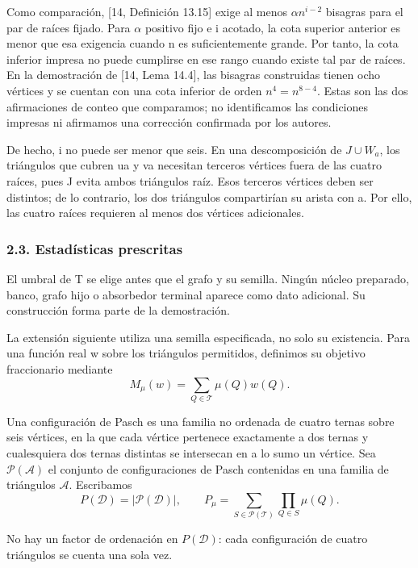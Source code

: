 \documentclass[spanish,11pt,a4paper]{article}
\begin{document}
Como comparación, {[}14, Definición 13.15{]} exige al menos \(\alpha n^{i-2}\) bisagras para el par de raíces fijado. Para \(\alpha\) positivo fijo e i acotado, la cota superior anterior es menor que esa exigencia cuando n es suficientemente grande. Por tanto, la cota inferior impresa no puede cumplirse en ese rango cuando existe tal par de raíces. En la demostración de {[}14, Lema 14.4{]}, las bisagras construidas tienen ocho vértices y se cuentan con una cota inferior de orden \(n^4=n^{8-4}\). Estas son las dos afirmaciones de conteo que comparamos; no identificamos las condiciones impresas ni afirmamos una corrección confirmada por los autores.

De hecho, i no puede ser menor que seis. En una descomposición de \(J\cup W_a\), los triángulos que cubren ua y va necesitan terceros vértices fuera de las cuatro raíces, pues J evita ambos triángulos raíz. Esos terceros vértices deben ser distintos; de lo contrario, los dos triángulos compartirían su arista con a. Por ello, las cuatro raíces requieren al menos dos vértices adicionales.

\subsubsection{2.3. Estadísticas prescritas}\label{estaduxedsticas-prescritas}

El umbral de T se elige antes que el grafo y su semilla. Ningún núcleo preparado, banco, grafo hijo o absorbedor terminal aparece como dato adicional. Su construcción forma parte de la demostración.

La extensión siguiente utiliza una semilla especificada, no solo su existencia. Para una función real w sobre los triángulos permitidos, definimos su objetivo fraccionario mediante
\[M_\mu(w)=\sum_{Q\in\mathcal T}\mu(Q)w(Q).                   \tag{2.7}\]

Una configuración de Pasch es una familia no ordenada de cuatro ternas sobre seis vértices, en la que cada vértice pertenece exactamente a dos ternas y cualesquiera dos ternas distintas se intersecan en a lo sumo un vértice. Sea \(\mathcal P(\mathcal A)\) el conjunto de configuraciones de Pasch contenidas en una familia de triángulos \(\mathcal A\). Escribamos
\[P(\mathcal D)=|\mathcal P(\mathcal D)|,
\qquad
P_\mu=\sum_{S\in\mathcal P(\mathcal T)}\prod_{Q\in S}\mu(Q).
                                                                    \tag{2.8}\]

No hay un factor de ordenación en \(P(\mathcal D)\): cada configuración de cuatro triángulos se cuenta una sola vez.
\end{document}
